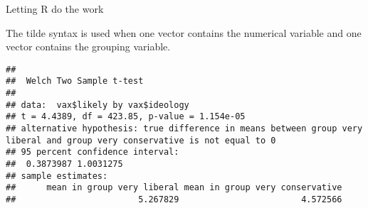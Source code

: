\documentclass[
  ignorenonframetext,
  aspectratio=169]{beamer}
\newenvironment{Shaded}{\begin{snugshade}}{\end{snugshade}}
\newcommand{\AttributeTok}[1]{\textcolor[rgb]{0.13,0.29,0.53}{#1}}
\newcommand{\CommentTok}[1]{\textcolor[rgb]{0.56,0.35,0.01}{\textit{#1}}}
\newcommand{\ConstantTok}[1]{\textcolor[rgb]{0.56,0.35,0.01}{#1}}
\newcommand{\DecValTok}[1]{\textcolor[rgb]{0.00,0.00,0.81}{#1}}
\newcommand{\FunctionTok}[1]{\textcolor[rgb]{0.13,0.29,0.53}{\textbf{#1}}}
\newcommand{\NormalTok}[1]{#1}
\newcommand{\SpecialCharTok}[1]{\textcolor[rgb]{0.81,0.36,0.00}{\textbf{#1}}}
\newcommand{\StringTok}[1]{\textcolor[rgb]{0.31,0.60,0.02}{#1}}
\begin{document}
\begin{frame}[fragile]{Letting R do the work}
\protect\hypertarget{letting-r-do-the-work}{}
\small

The tilde syntax is used when one vector contains the numerical variable
and one vector contains the grouping variable.

\vspace{0.3cm}

\scriptsize

\begin{Shaded}
\end{Shaded}

\begin{verbatim}
## 
##  Welch Two Sample t-test
## 
## data:  vax$likely by vax$ideology
## t = 4.4389, df = 423.85, p-value = 1.154e-05
## alternative hypothesis: true difference in means between group very liberal and group very conservative is not equal to 0
## 95 percent confidence interval:
##  0.3873987 1.0031275
## sample estimates:
##      mean in group very liberal mean in group very conservative 
##                        5.267829                        4.572566
\end{verbatim}
\end{frame}
\end{document}
